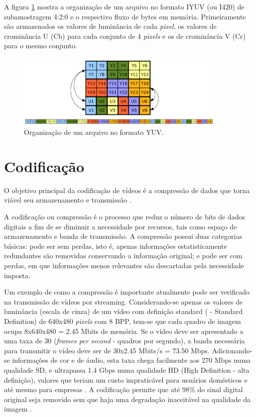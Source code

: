 A figura \ref{fig:yuvorganization} mostra a organização de um arquivo no formato IYUV (ou I420) de subamostragem 4:2:0 e o respectivo fluxo de bytes em memória. Primeiramente são armazenados os valores de luminância de cada \emph{pixel}, os valores de crominância U (Cb) para cada conjunto de 4 \emph{pixels} e os de crominância V (Cr) para o mesmo conjunto.

\begin{figure}[!htb]
	\centering
	\includegraphics[width=0.9\textwidth]{./imgs/yuvorganization.png}
	\caption{Organização de um arquivo no formato YUV.}
	\label{fig:yuvorganization}
\end{figure}

\section{Codificação}

O objetivo principal da codificação de vídeos é a compressão de dados que torna viável seu armazenamento e transmissão \cite{daronco}.

A codificação ou compressão é o processo que reduz o número de bits de dados digitais a fim de se diminuir a necessidade por recursos, tais como espaço de armazenamento e banda de transmissão. A compressão possui duas categorias básicas: pode ser sem perdas, isto é, apenas informações estatisticamente redundantes são removidas conservando a informação original; e pode ser com perdas, em que informações menos relevantes são descartadas pela necessidade imposta.

Um exemplo de como a compressão é importante atualmente pode ser verificado na transmissão de vídeos por streaming. Considerando-se apenas os valores de luminância (escala de cinza) de um vídeo com definição standard ( - Standard Definition) de 640x480 \emph{pixels} com 8 BPP, tem-se que cada quadro de imagem ocupa 8x640x480 = 2.45 Mbits de memória. Se o vídeo deve ser apresentado a uma taxa de 30  (\emph{frames per second} - quadros por segundo), a banda necessária para transmitir o vídeo deve ser de 30x2.45 Mbits/s = 73.50 Mbps. Adicionando-se informações de cor e de áudio, esta taxa chega facilmente aos 270 Mbps numa qualidade SD, e ultrapassa 1.4 Gbps numa qualidade HD (High Definition - alta definição), valores que teriam um custo impraticável para usuários domésticos e até mesmo para empresas \cite{ciscoieee}. A codificação permite que até 98\% do sinal digital original seja removido sem que haja uma degradação inaceitável na qualidade da imagem \cite{mpeg2ref}.

